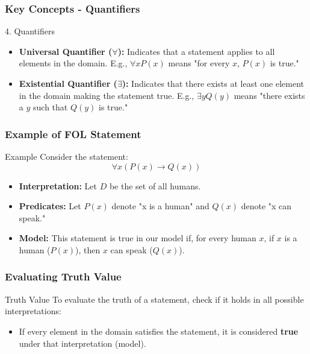 \documentclass[aspectratio=169]{beamer}
\begin{document}
\begin{frame}[fragile]
    \frametitle{Key Concepts - Quantifiers}
    \begin{block}{4. Quantifiers}
        \begin{itemize}
            \item \textbf{Universal Quantifier ($\forall$):} Indicates that a statement applies to all elements in the domain. 
                  E.g., $\forall x P(x)$ means "for every $x$, $P(x)$ is true."
            \item \textbf{Existential Quantifier ($\exists$):} Indicates that there exists at least one element in the domain making the statement true.
                  E.g., $\exists y Q(y)$ means "there exists a $y$ such that $Q(y)$ is true."
        \end{itemize}
    \end{block}
\end{frame}

\begin{frame}[fragile]
    \frametitle{Example of FOL Statement}
    \begin{block}{Example}
        Consider the statement: 
        \begin{equation}
            \forall x (P(x) \rightarrow Q(x))
        \end{equation}
        \begin{itemize}
            \item \textbf{Interpretation:} Let $D$ be the set of all humans.
            \item \textbf{Predicates:} Let $P(x)$ denote "x is a human" and $Q(x)$ denote "x can speak."
            \item \textbf{Model:} This statement is true in our model if, for every human $x$, if $x$ is a human ($P(x)$), then $x$ can speak ($Q(x)$).
        \end{itemize}
    \end{block}
\end{frame}

\begin{frame}[fragile]
    \frametitle{Evaluating Truth Value}
    \begin{block}{Truth Value}
        To evaluate the truth of a statement, check if it holds in all possible interpretations:
        \begin{itemize}
            \item If every element in the domain satisfies the statement, it is considered \textbf{true} under that interpretation (model).
        \end{itemize}
    \end{block}
\end{frame}
\end{document}
